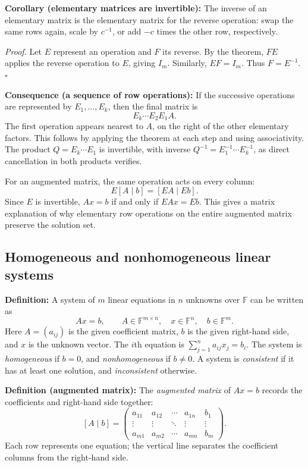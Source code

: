 \documentclass[a4paper,11pt,abstract=true]{scrartcl}
\theoremstyle{dotlessP}
\theoremstyle{dotlessS}
\theoremstyle{remark}
\theoremstyle{definition}
\begin{document}
\begin{claim_box}
\textbf{Corollary (elementary matrices are invertible):}
The inverse of an elementary matrix is the elementary matrix for the
reverse operation: swap the same rows again, scale by $c^{-1}$,
or add $-c$ times the other row, respectively.

\textit{Proof.} Let $E$ represent an operation and $F$ its reverse.
By the theorem, $FE$ applies the reverse operation to $E$, giving
$I_m$. Similarly, $EF=I_m$. Thus $F=E^{-1}$. \hfill$\square$
\end{claim_box}

\begin{claim_box}
\textbf{Consequence (a sequence of row operations):} If the
successive operations are represented by $E_1,\ldots,E_k$, then the
final matrix is
\[
E_k\cdots E_2E_1A.
\]
The first operation appears nearest to $A$, on the right of the other
elementary factors. This follows by applying the theorem at each step
and using associativity. The product $Q=E_k\cdots E_1$ is invertible,
with inverse $Q^{-1}=E_1^{-1}\cdots E_k^{-1}$, as direct cancellation
in both products verifies.

For an augmented matrix, the same operation acts on every column:
\[
E[A\mid b]=[EA\mid Eb].
\]
Since $E$ is invertible, $Ax=b$ if and only if $EAx=Eb$.
This gives a matrix explanation of why elementary row operations on
the entire augmented matrix preserve the solution set.
\end{claim_box}

\subsection{Homogeneous and nonhomogeneous linear systems}

\begin{definition_box}
\textbf{Definition:} A system of $m$ linear equations in $n$
unknowns over $\mathbb{F}$ can be written as
\[
Ax=b,
\qquad A\in\mathbb{F}^{m\times n},\quad
x\in\mathbb{F}^n,\quad b\in\mathbb{F}^m.
\]
Here $A=(a_{ij})$ is the given coefficient matrix, $b$ is the given
right-hand side, and $x$ is the unknown vector. The $i$th equation is
$\sum_{j=1}^n a_{ij}x_j=b_i$. The system is \emph{homogeneous} if
$b=0$, and \emph{nonhomogeneous} if $b\neq0$. A system is
\emph{consistent} if it has at least one solution, and
\emph{inconsistent} otherwise.
\end{definition_box}

\begin{claim_box}
\textbf{Definition (augmented matrix):} The \emph{augmented matrix}
of $Ax=b$ records the coefficients and right-hand side together:
\[
[A\mid b]=\left(\begin{array}{cccc|c}
a_{11}&a_{12}&\cdots&a_{1n}&b_1\\
\vdots&\vdots&\ddots&\vdots&\vdots\\
a_{m1}&a_{m2}&\cdots&a_{mn}&b_m
\end{array}\right).
\]
Each row represents one equation; the vertical line separates the
coefficient columns from the right-hand side.
\end{claim_box}
\end{document}

